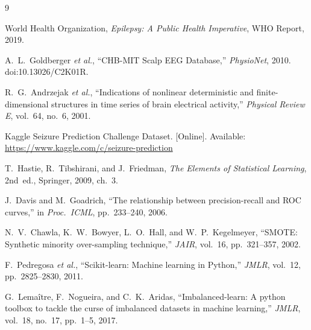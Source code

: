 \documentclass[conference]{IEEEtran}
\begin{document}
\begin{thebibliography}{9}

World Health Organization,
\textit{Epilepsy: A Public Health Imperative},
WHO Report, 2019.

A.~L.~Goldberger \textit{et al.},
``CHB-MIT Scalp EEG Database,''
\textit{PhysioNet}, 2010.
doi:10.13026/C2K01R.

R.~G.~Andrzejak \textit{et al.},
``Indications of nonlinear deterministic and finite-dimensional structures in
time series of brain electrical activity,''
\textit{Physical Review E}, vol.~64, no.~6, 2001.

Kaggle Seizure Prediction Challenge Dataset.
[Online]. Available: \url{https://www.kaggle.com/c/seizure-prediction}

T.~Hastie, R.~Tibshirani, and J.~Friedman,
\textit{The Elements of Statistical Learning},
2nd~ed., Springer, 2009, ch.~3.

J.~Davis and M.~Goadrich,
``The relationship between precision-recall and ROC curves,''
in \textit{Proc.\ ICML}, pp.~233--240, 2006.

N.~V.~Chawla, K.~W.~Bowyer, L.~O.~Hall, and W.~P.~Kegelmeyer,
``SMOTE: Synthetic minority over-sampling technique,''
\textit{JAIR}, vol.~16, pp.~321--357, 2002.

F.~Pedregosa \textit{et al.},
``Scikit-learn: Machine learning in Python,''
\textit{JMLR}, vol.~12, pp.~2825--2830, 2011.

G.~Lema\^{i}tre, F.~Nogueira, and C.~K.~Aridas,
``Imbalanced-learn: A python toolbox to tackle the curse of imbalanced
datasets in machine learning,''
\textit{JMLR}, vol.~18, no.~17, pp.~1--5, 2017.

\end{thebibliography}
\end{document}
